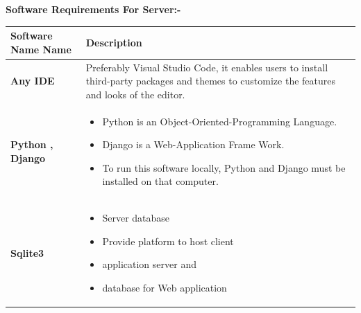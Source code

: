 \textbf{Software Requirements For Server:-}
\begin{center}
\setlength{\tabcolsep}{0.8cm}
\renewcommand{\arraystretch}{1.2}
        \centering
        \begin{longtable}{|m{90pt}|p{9cm}|}
            \hline
                \textbf{Software Name Name} & \textbf{Description}\\
            \hline
                \textbf{Any IDE} &
                    Preferably Visual Studio Code, it enables users to install third-party packages and themes to customize the features and looks of the editor.\\
            \hline
               \textbf{ Python , Django} &
                    \begin{itemize}
                        \item  Python is an Object-Oriented-Programming Language.
                        \item  Django is a Web-Application Frame Work.
                        \item   To run this software locally, Python and Django must be installed on that computer.
                    \end{itemize} \\
            \hline
                \textbf{Sqlite3} &
                    \begin{itemize}
                        \item  Server database
                        \item Provide platform to host client
                        \item application server and
                        \item database for Web application
                    \end{itemize}\\
            \hline
        \end{longtable}
\end{center}



